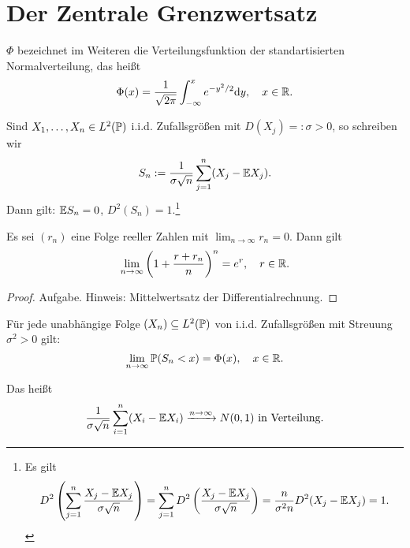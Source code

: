 \section{Der Zentrale Grenzwertsatz}
\begin{deno*}
  $\Phi$ bezeichnet im Weiteren die Verteilungsfunktion der standartisierten
  Normalverteilung, das heißt
  \[ \Phi(x) = \frac{1}{\sqrt{2 \pi}} \int_{- \infty}^x e^{-y^2/2} \mathrm{d} y, \quad
    x \in \mathbb{R}. \]

  Sind $X_1, \ldots, X_n \in L^2(\mathbb{P})$ i.i.d. Zufallsgrößen mit $D(X_j) =:
  \sigma > 0$, so schreiben wir
  \[ S_n := \frac{1}{\sigma \sqrt{n}} \sum_{j=1}^n (X_j - \mathbb{E} X_j). \]
  Dann gilt: $\mathbb{E} S_n = 0$, $D^2(S_n) = 1$.\footnote{%
    Es gilt
    \[ D^2 \left( \sum_{j=1}^n \frac{X_j - \mathbb{E} X_j}{\sigma \sqrt{n}}  \right)
      = \sum_{j=1}^n D^2 \left( \frac{X_j - \mathbb{E} X_j}{\sigma \sqrt{n}} \right)
      = \frac{n}{\sigma^2 n} D^2( X_j - \mathbb{E} X_j) = 1. \]
  }
\end{deno*}

\begin{lem}
  Es sei $(r_n)$ eine Folge reeller Zahlen mit $\lim_{n \to \infty} r_n = 0$.
  Dann gilt
  \[ \lim_{n \to \infty} \left( 1 + \frac{r+r_n}{n} \right)^n = e^r, \quad r
    \in \mathbb{R}. \]
\end{lem}

\begin{proof}
  Aufgabe. Hinweis: Mittelwertsatz der Differentialrechnung.
\end{proof}

\begin{thm}
  Für jede unabhängige Folge $(X_n) \subseteq L^2(\mathbb{P})$ von i.i.d. Zufallsgrößen
  mit Streuung $\sigma^2 > 0$ gilt:
  \[ \lim_{n \to \infty} \mathbb{P}( S_n < x ) = \Phi(x), \quad x \in \mathbb{R}. \]
\end{thm}
Das heißt
\[ \frac{1}{\sigma \sqrt{n}} \sum_{i = 1}^n (X_i - \mathbb{E} X_i) \xrightarrow{n \to
    \infty} N(0,1) \text{ in Verteilung.} \]


